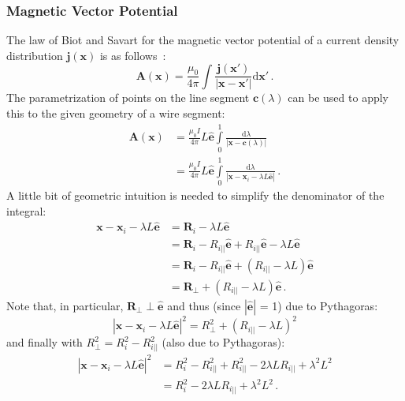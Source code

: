 \subsubsection{Magnetic Vector Potential}
The law of Biot and Savart for the magnetic vector potential of a current density distribution $\mathbf{j}(\mathbf{x})$ is as follows~\cite{jackson}:
\begin{equation}
 \mathbf{A}(\mathbf{x}) = \frac{\mu_0}{4 \pi} \int \frac{\mathbf{j}(\mathbf{x}')}{|\mathbf{x} - \mathbf{x}'|} \mathrm{d}\mathbf{x}' \, .
\end{equation}
The parametrization of points on the line segment $\mathbf{c}(\lambda)$ can be used to apply this to the given geometry of a wire segment:
\begin{align}
 \mathbf{A}(\mathbf{x}) & = \frac{\mu_0 I}{4 \pi} L \hat{\mathbf{e}} \int\limits_0^1 \frac{\mathrm{d}\lambda}{|\mathbf{x} - \mathbf{c}(\lambda)|} \\
        ~               & = \frac{\mu_0 I}{4 \pi} L \hat{\mathbf{e}} \int\limits_0^1 \frac{\mathrm{d}\lambda}{|\mathbf{x} - \mathbf{x}_i - \lambda L \hat{\mathbf{e}}|} \, .
\end{align}
A little bit of geometric intuition is needed to simplify the denominator of the integral:
\begin{align}
 \mathbf{x} - \mathbf{x}_i - \lambda L \hat{\mathbf{e}}
   & = \mathbf{R}_i - \lambda L \hat{\mathbf{e}} \\
 ~ & = \mathbf{R}_i - R_{i ||} \hat{\mathbf{e}} + R_{i ||} \hat{\mathbf{e}} - \lambda L \hat{\mathbf{e}} \\
 ~ & = \mathbf{R}_i - R_{i ||} \hat{\mathbf{e}} + \left( R_{i ||} - \lambda L \right) \hat{\mathbf{e}} \\
 ~ & = \mathbf{R}_\perp + \left( R_{i ||} - \lambda L \right) \hat{\mathbf{e}} \, .
\end{align}
Note that, in particular, $\mathbf{R}_\perp \perp \hat{\mathbf{e}}$ and thus (since $|\hat{\mathbf{e}}|$ = 1) due to Pythagoras:
\begin{equation}
 | \mathbf{x} - \mathbf{x}_i - \lambda L \hat{\mathbf{e}} |^2 = R_\perp^2 + \left( R_{i ||} - \lambda L \right)^2
\end{equation}
and finally with $R_\perp^2 = R_i^2 - R_{i ||}^2$ (also due to Pythagoras):
\begin{align}
 | \mathbf{x} - \mathbf{x}_i - \lambda L \hat{\mathbf{e}} |^2
   & = R_i^2 - R_{i ||}^2 + R_{i ||}^2 - 2 \lambda L R_{i ||} + \lambda^2 L^2 \\
 ~ & = R_i^2 - 2 \lambda L R_{i ||} + \lambda^2 L^2 \, .
\end{align}
